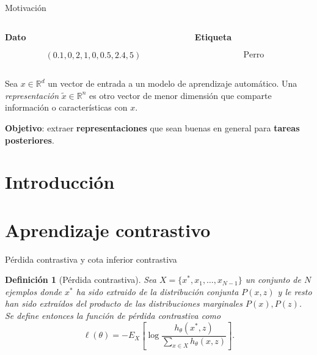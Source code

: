 \documentclass[aspectratio=169]{beamer}
\newcommand{\R}{\mathbb{R}}
\newtheorem{defi}{Definición}
\begin{document}
  \begin{frame}{Motivación}

  \centering
  \begin{columns}
      \begin{column}{0.5\textwidth}
        \begin{center}
        \textbf{Dato}
        \end{center}
        \[
      \left(0.1,0,2,1,0,0.5,2.4,5 \right)  
     \]
      \end{column}
      \begin{column}{0.5\textwidth}  %
        \begin{center}
          \textbf{Etiqueta}
          \end{center}
        \[
        \text{Perro}  
        \]

      \end{column}
    \end{columns}


    \pause 
    
    \begin{shaded}
      Sea $x \in \R^d$ un vector de entrada a un modelo de aprendizaje automático. Una \emph{representación} $\tilde{x} \in \R^n$ es otro vector de menor dimensión que comparte información o características con $x$.
    \end{shaded}


    {\color{Maroon}\textbf{Objetivo}:} extraer \textbf{representaciones} que sean buenas en general para \textbf{tareas posteriores}.
  \end{frame}

  
\section{Introducción}


  \section{Aprendizaje contrastivo}


      

  
  \begin{frame}{Pérdida contrastiva y cota inferior contrastiva}
    
    \begin{defi}[Pérdida contrastiva]
      Sea \(X =\{x^*,x_1,\dots,x_{N-1}\}\) un conjunto de \(N\) ejemplos donde $x^*$ ha sido extraido de la distribución conjunta \(P(x,z)\) y le resto han sido extraídos del producto de las distribuciones marginales \(P(x),P(z)\). Se define entonces la función de pérdida contrastiva como  
      \[ 
        \ell(\theta) = - E_X \left[ \log \frac{h_\theta(x^*,z)}{\sum_{x \in X}h_\theta(x,z)}\right]. 
        \]
    \end{defi}

  
  \end{frame}
\end{document}
